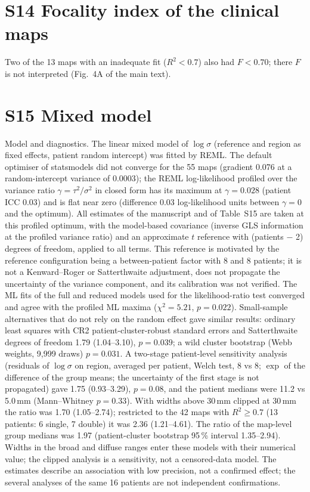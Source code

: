 \documentclass[10pt,a4paper]{article}
\renewcommand{\thetable}{S\arabic{table}}
\newcommand{\stab}[1]{\renewcommand{\thetable}{#1}}
\begin{document}
\section*{S14 Focality index of the clinical maps}
Two of the 13 maps with an inadequate fit ($R^2 < 0.7$) also had $F < 0.70$; there $F$ is not interpreted (Fig.~4A of the main text).
\stab{S14}
\stab{S14b}

\section*{S15 Mixed model}
Model and diagnostics.  The linear mixed model of $\log\sigma$ (reference and region as fixed effects, patient random intercept) was fitted by REML.  The default optimiser of statsmodels did not converge for the 55 maps (gradient 0.076 at a random-intercept variance of 0.0003); the REML log-likelihood profiled over the variance ratio $\gamma = \tau^2/\sigma^2$ in closed form has its maximum at $\gamma = 0.028$ (patient ICC 0.03) and is flat near zero (difference 0.03 log-likelihood units between $\gamma = 0$ and the optimum).  All estimates of the manuscript and of Table~S15 are taken at this profiled optimum, with the model-based covariance (inverse GLS information at the profiled variance ratio) and an approximate $t$ reference with (patients $-$ 2) degrees of freedom, applied to all terms.  This reference is motivated by the reference configuration being a between-patient factor with 8 and 8 patients; it is not a Kenward--Roger or Satterthwaite adjustment, does not propagate the uncertainty of the variance component, and its calibration was not verified.  The ML fits of the full and reduced models used for the likelihood-ratio test converged and agree with the profiled ML maxima ($\chi^2 = 5.21$, $p = 0.022$).  Small-sample alternatives that do not rely on the random effect gave similar results: ordinary least squares with CR2 patient-cluster-robust standard errors and Satterthwaite degrees of freedom 1.79 (1.04--3.10), $p = 0.039$; a wild cluster bootstrap (Webb weights, 9{,}999 draws) $p = 0.031$.  A two-stage patient-level sensitivity analysis (residuals of $\log\sigma$ on region, averaged per patient, Welch test, 8 vs 8; $\exp$ of the difference of the group means; the uncertainty of the first stage is not propagated) gave 1.75 (0.93--3.29), $p = 0.08$, and the patient medians were 11.2 vs 5.0\,mm (Mann--Whitney $p = 0.33$).  With widths above 30\,mm clipped at 30\,mm the ratio was 1.70 (1.05--2.74); restricted to the 42 maps with $R^2 \ge 0.7$ (13 patients: 6 single, 7 double) it was 2.36 (1.21--4.61).  The ratio of the map-level group medians was 1.97 (patient-cluster bootstrap 95\,\% interval 1.35--2.94).  Widths in the broad and diffuse ranges enter these models with their numerical value; the clipped analysis is a sensitivity, not a censored-data model.  The estimates describe an association with low precision, not a confirmed effect; the several analyses of the same 16 patients are not independent confirmations.
\stab{S15}
\end{document}

